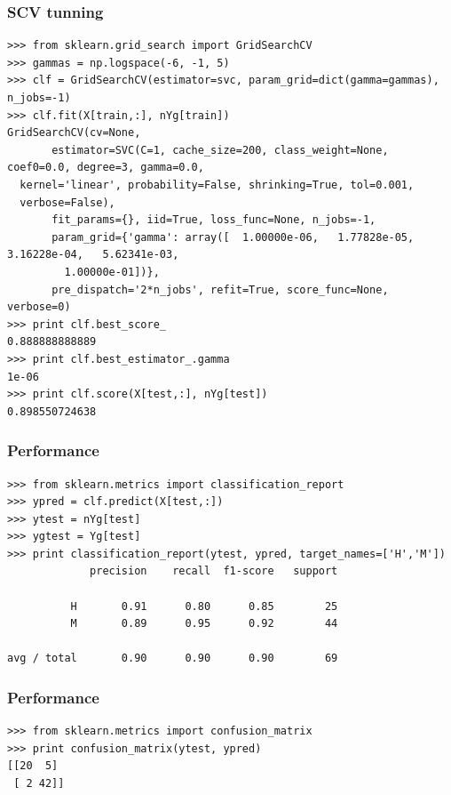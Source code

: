 \documentclass[10pt, colorlinks]{beamer}
\begin{document}
\begin{frame}[fragile]\frametitle{SCV tunning}
\small 
\begin{verbatim}
>>> from sklearn.grid_search import GridSearchCV
>>> gammas = np.logspace(-6, -1, 5)
>>> clf = GridSearchCV(estimator=svc, param_grid=dict(gamma=gammas), n_jobs=-1)
>>> clf.fit(X[train,:], nYg[train]) 
GridSearchCV(cv=None,
       estimator=SVC(C=1, cache_size=200, class_weight=None, coef0=0.0, degree=3, gamma=0.0,
  kernel='linear', probability=False, shrinking=True, tol=0.001,
  verbose=False),
       fit_params={}, iid=True, loss_func=None, n_jobs=-1,
       param_grid={'gamma': array([  1.00000e-06,   1.77828e-05,   3.16228e-04,   5.62341e-03,
         1.00000e-01])},
       pre_dispatch='2*n_jobs', refit=True, score_func=None, verbose=0)
>>> print clf.best_score_
0.888888888889
>>> print clf.best_estimator_.gamma
1e-06
>>> print clf.score(X[test,:], nYg[test])
0.898550724638
\end{verbatim}

\end{frame}
\begin{frame}[fragile]\frametitle{Performance}
\begin{verbatim}
>>> from sklearn.metrics import classification_report
>>> ypred = clf.predict(X[test,:])
>>> ytest = nYg[test]
>>> ygtest = Yg[test]
>>> print classification_report(ytest, ypred, target_names=['H','M'])
             precision    recall  f1-score   support

          H       0.91      0.80      0.85        25
          M       0.89      0.95      0.92        44

avg / total       0.90      0.90      0.90        69

\end{verbatim}

\end{frame}

\begin{frame}[fragile]\frametitle{Performance}
\begin{verbatim}
>>> from sklearn.metrics import confusion_matrix
>>> print confusion_matrix(ytest, ypred)
[[20  5]
 [ 2 42]]
\end{verbatim}

\end{frame}
\end{document}

